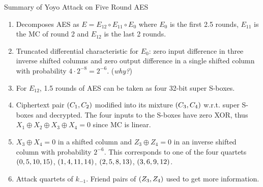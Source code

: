 \documentclass[notheorems]{beamer}
\theoremstyle{definition}
\theoremstyle{example}
\begin{document}
    \begin{frame}[<+->]{Summary of Yoyo Attack on Five Round AES}
        \begin{enumerate}
            \item Decomposes AES as \(E = E_{12} \circ E_{11} \circ E_0\) where
            \(E_0\) is the first 2.5 rounds, \(E_{11}\) is the MC of round 2 and
            \(E_{12}\) is the last 2 rounds.
            \item Truncated differential characteristic for \(E_0\): zero input
            difference in three inverse shifted columns and zero output
            difference in a single shifted column with probability \(4 \cdot
            2^{-8} = 2^{-6}\). (\emph{why?})
            \item For \(E_{12}\), 1.5 rounds of AES can be taken as four 32-bit
            super S-boxes.
            \item Ciphertext pair \((C_1, C_2)\) modified into its mixture
            \((C_3, C_4)\) w.r.t. super S-boxes and decrypted. The four
            inputs to the S-boxes have zero XOR, thus \(X_1 \oplus X_2 \oplus
            X_3 \oplus X_4 = 0\) since MC is linear. 
            \item \(X_3 \oplus X_4 = 0\) in a shifted column and \(Z_3 \oplus
            Z_4 = 0\) in an inverse shifted column with probability \(2^{-6}\).
            This corresponds to one of the four quartets \((0,5,10,15)\),
            \((1,4,11,14)\), \((2,5,8,13)\), \((3,6,9,12)\).
            \item Attack quartets of \(k_{-1}\). Friend pairs of \((Z_3,
            Z_4)\) used to get more information.
        \end{enumerate}
    \end{frame}
\end{document}
